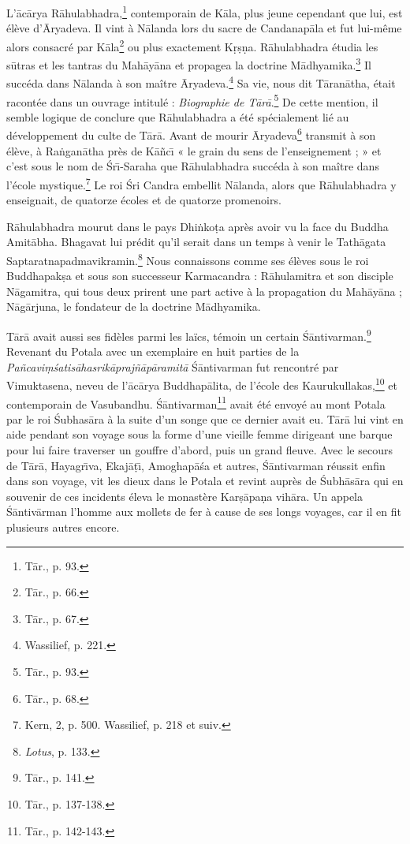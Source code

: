 \documentclass[a4paper, 11pt, oneside, french, landscape, twocolumn]{article}
\begin{document}
L'\={a}c\={a}rya R\={a}hulabhadra,\footnote{T\={a}r., p. 93.} contemporain de K\={a}la, plus jeune cependant que lui, est élève d'\={A}ryadeva. Il vint à N\={a}landa lors du sacre de Candanap\={a}la et fut lui-même alors consacré par K\={a}la\footnote{T\={a}r., p. 66.} ou plus exactement K\d{r}\d{s}\d{n}a. R\={a}hulabhadra étudia les s\={u}tras et les tantras du Mah\={a}y\={a}na et propagea la doctrine M\={a}dhyamika.\footnote{T\={a}r., p. 67.} Il succéda dans N\={a}landa à son maître \={A}ryadeva.\footnote{Wassilief, p. 221.} Sa vie, nous dit T\={a}ran\={a}tha, était racontée dans un ouvrage intitulé : \emph{Biographie de T\={a}r\={a}}.\footnote{T\={a}r., p. 93.} De cette mention, il semble logique de conclure que R\={a}hulabhadra a été spécialement lié au développement du culte de T\={a}r\={a}. Avant de mourir \={A}ryadeva\footnote{T\={a}r., p. 68.} transmit à son élève, à Ra\.{n}gan\={a}tha près de K\={a}\~{n}c\={\i} « le grain du sens de l'enseignement ; » et c'est sous le nom de \'{S}r\={\i}-Saraha que R\={a}hulabhadra succéda à son maître dans l'école mystique.\footnote{Kern, 2, p. 500. Wassilief, p. 218 et suiv.} Le roi \'{S}ri Candra embellit N\={a}landa, alors que R\={a}hulabhadra y enseignait, de quatorze écoles et de quatorze promenoirs.

R\={a}hulabhadra mourut dans le pays Dhi\.{n}ko\d{t}a après avoir vu la face du Buddha Amit\={a}bha. Bhagavat lui prédit qu'il serait dans un temps à venir le Tath\={a}gata Saptaratnapadmavikramin.\footnote{\emph{Lotus}, p. 133.} Nous connaissons comme ses élèves sous le roi Buddhapak\d{s}a et sous son successeur Karmacandra : R\={a}hulamitra et son disciple N\={a}gamitra, qui tous deux prirent une part active à la propagation du Mah\={a}y\={a}na ; N\={a}g\={a}rjuna, le fondateur de la doctrine M\={a}dhyamika.

T\={a}r\={a} avait aussi ses fidèles parmi les laïcs, témoin un certain \'{S}\={a}ntivarman.\footnote{T\={a}r., p. 141.} Revenant du Potala avec un exemplaire en huit parties de la \emph{Pa\~{n}cavi\d{m}\'{s}atis\={a}hasrik\={a}praj\~{n}\={a}p\={a}ramit\={a}} \'{S}\={a}ntivarman fut rencontré par Vimuktasena, neveu de l'\={a}c\={a}rya Buddhap\={a}lita, de l'école des Kaurukullakas,\footnote{T\={a}r., p. 137-138.} et contemporain de Vasubandhu. \'{S}\={a}ntivarman\footnote{T\={a}r., p. 142-143.} avait été envoyé au mont Potala par le roi \'{S}ubhas\={a}ra à la suite d'un songe que ce dernier avait eu. T\={a}r\={a} lui vint en aide pendant son voyage sous la forme d'une vieille femme dirigeant une barque pour lui faire traverser un gouffre d'abord, puis un grand fleuve. Avec le secours de T\={a}r\={a}, Hayagr\={\i}va, Ekaj\={a}\d{t}\={\i}, Amoghap\={a}\'{s}a et autres, \'{S}\={a}ntivarman réussit enfin dans son voyage, vit les dieux dans le Potala et revint auprès de \'{S}ubh\={a}s\={a}ra qui en souvenir de ces incidents éleva le monastère Kar\d{s}\={a}pa\d{n}a vih\={a}ra. Un appela \'{S}\={a}ntiv\={a}rman l'homme aux mollets de fer à cause de ses longs voyages, car il en fit plusieurs autres encore.
\end{document}
